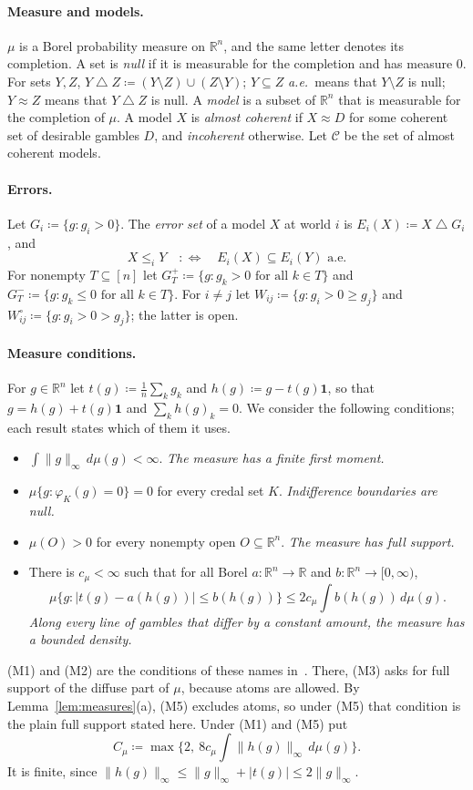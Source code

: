 \documentclass[11pt]{article}
\theoremstyle{definition}
\newcommand{\R}{\mathbb R}
\newcommand{\one}{\mathbf 1}
\newcommand{\Cc}{\mathcal C}
\newcommand{\sd}{\mathbin{\triangle}}
\begin{document}
\paragraph{Measure and models.}
$\mu$ is a Borel probability measure on $\R^n$, and the same letter denotes its completion. A set is \emph{null} if it is measurable for the completion and has measure $0$. For sets $Y,Z$, $Y\sd Z\coloneqq(Y\setminus Z)\cup(Z\setminus Y)$; $Y\subseteq Z$ \emph{a.e.}\ means that $Y\setminus Z$ is null; $Y\approx Z$ means that $Y\sd Z$ is null. A \emph{model} is a subset of $\R^n$ that is measurable for the completion of $\mu$. A model $X$ is \emph{almost coherent} if $X\approx D$ for some coherent set of desirable gambles $D$, and \emph{incoherent} otherwise. Let $\Cc$ be the set of almost coherent models.

\paragraph{Errors.}
Let $G_i\coloneqq\{g:g_i>0\}$. The \emph{error set} of a model $X$ at world $i$ is $E_i(X)\coloneqq X\sd G_i$, and
\[
X\le_iY\quad:\Longleftrightarrow\quad E_i(X)\subseteq E_i(Y)\text{ a.e.}
\]
For nonempty $T\subseteq[n]$ let $G_T^+\coloneqq\{g:g_k>0\text{ for all }k\in T\}$ and $G_T^-\coloneqq\{g:g_k\le0\text{ for all }k\in T\}$. For $i\ne j$ let $W_{ij}\coloneqq\{g:g_i>0\ge g_j\}$ and $W^\circ_{ij}\coloneqq\{g:g_i>0>g_j\}$; the latter is open.

\paragraph{Measure conditions.}
For $g\in\R^n$ let $t(g)\coloneqq\frac1n\sum_kg_k$ and $h(g)\coloneqq g-t(g)\one$, so that $g=h(g)+t(g)\one$ and $\sum_kh(g)_k=0$. We consider the following conditions; each result states which of them it uses.
\begin{itemize}[leftmargin=3.2em]
\item[(M1)] $\int\|g\|_\infty\,d\mu(g)<\infty$. \emph{The measure has a finite first moment.}
\item[(M2)] $\mu\{g:\varphi_K(g)=0\}=0$ for every credal set $K$. \emph{Indifference boundaries are null.}
\item[(M3)] $\mu(O)>0$ for every nonempty open $O\subseteq\R^n$. \emph{The measure has full support.}
\item[(M5)] There is $c_\mu<\infty$ such that for all Borel $a:\R^n\to\R$ and $b:\R^n\to[0,\infty)$,
\[
\mu\big\{g:|t(g)-a(h(g))|\le b(h(g))\big\}\le2c_\mu\int b(h(g))\,d\mu(g).
\]
\emph{Along every line of gambles that differ by a constant amount, the measure has a bounded density.}
\end{itemize}
(M1) and (M2) are the conditions of these names in~\cite{App}. There, (M3) asks for full support of the diffuse part of $\mu$, because atoms are allowed. By Lemma~\ref{lem:measures}(a), (M5) excludes atoms, so under (M5) that condition is the plain full support stated here. Under (M1) and (M5) put
\[
C_\mu\coloneqq\max\Big\{2,\ 8c_\mu\int\|h(g)\|_\infty\,d\mu(g)\Big\}.
\]
It is finite, since $\|h(g)\|_\infty\le\|g\|_\infty+|t(g)|\le2\|g\|_\infty$.
\end{document}
